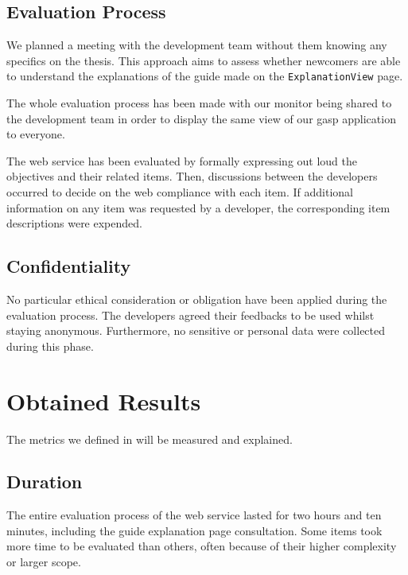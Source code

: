 \subsection{Evaluation Process}
\label{subsec:use_methodology_evaluation}

We planned a meeting with the  development team without them knowing any specifics on the thesis. This approach aims to assess whether  newcomers are able to understand the explanations of the guide made on the \texttt{ExplanationView} page.

The whole evaluation process has been made with our monitor being shared to the development team in order to display the same view of our \gls{gasp} application to everyone.

The web service has been evaluated by formally expressing out loud the objectives and their related items. Then, discussions between the developers occurred to decide on the web compliance with each item. If additional information on any item was requested by a developer, the corresponding item descriptions were expended.

\subsection{Confidentiality}
\label{subsec:use_methodology_confidentiality}

No particular ethical consideration or obligation have been applied during the evaluation process. The developers agreed their feedbacks to be used whilst staying anonymous. Furthermore, no sensitive or personal data were collected during this phase.

\section{Obtained Results}
\label{sec:use_results}

The metrics we defined in  will be measured and explained.

\subsection{Duration}
\label{subsec:use_results_duration}

The entire evaluation process of the web service lasted for two hours and ten minutes, including the guide explanation page consultation. Some items took more time to be evaluated than others, often because of their higher complexity or larger scope.

